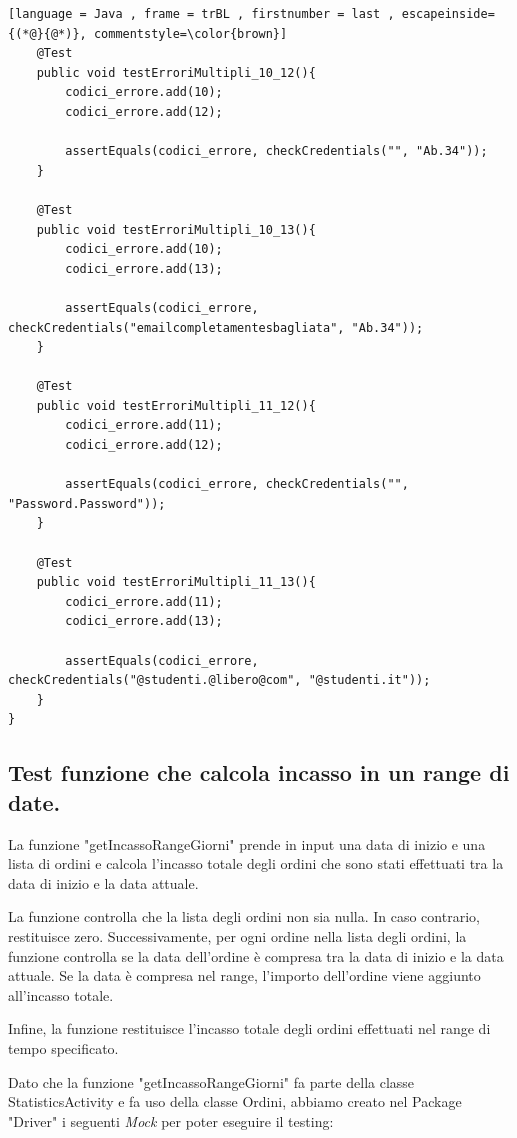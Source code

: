 \begin{lstlisting}[language = Java , frame = trBL , firstnumber = last , escapeinside={(*@}{@*)}, commentstyle=\color{brown}]
    @Test
    public void testErroriMultipli_10_12(){
        codici_errore.add(10);
        codici_errore.add(12);

        assertEquals(codici_errore, checkCredentials("", "Ab.34"));
    }

    @Test
    public void testErroriMultipli_10_13(){
        codici_errore.add(10);
        codici_errore.add(13);

        assertEquals(codici_errore, checkCredentials("emailcompletamentesbagliata", "Ab.34"));
    }

    @Test
    public void testErroriMultipli_11_12(){
        codici_errore.add(11);
        codici_errore.add(12);

        assertEquals(codici_errore, checkCredentials("", "Password.Password"));
    }

    @Test
    public void testErroriMultipli_11_13(){
        codici_errore.add(11);
        codici_errore.add(13);

        assertEquals(codici_errore, checkCredentials("@studenti.@libero@com", "@studenti.it"));
    }
}

\end{lstlisting}



\subsection{Test funzione che calcola incasso in un range di date.}
\begin{flushleft}
   La funzione "getIncassoRangeGiorni" prende in input una data di inizio e una lista di ordini e calcola l'incasso totale degli ordini che sono stati effettuati tra la data di inizio e la data attuale.

    La funzione controlla che la lista degli ordini non sia nulla. In caso contrario, restituisce zero. Successivamente, per ogni ordine nella lista degli ordini, la funzione controlla se la data dell'ordine è compresa tra la data di inizio e la data attuale. Se la data è compresa nel range, l'importo dell'ordine viene aggiunto all'incasso totale.
    
    Infine, la funzione restituisce l'incasso totale degli ordini effettuati nel range di tempo specificato.
\end{flushleft}
\vspace{0.2cm}

\begin{flushleft}
    Dato che la funzione "getIncassoRangeGiorni" fa parte della classe StatisticsActivity e fa uso della classe Ordini,
    abbiamo creato nel Package "Driver" i seguenti \textit{Mock} per poter eseguire il testing:
\end{flushleft}
\vspace{1cm}

